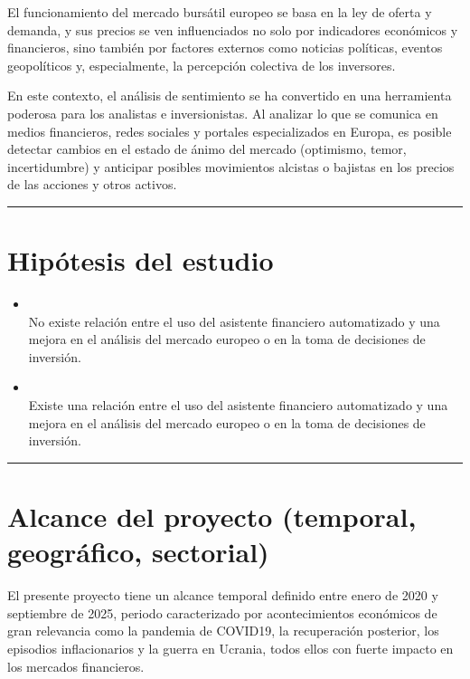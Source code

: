 \documentclass[letterpaper,10pt,spanish]{sphinxmanual}
\begin{document}
\sphinxAtStartPar
El funcionamiento del mercado bursátil europeo se basa en la ley de oferta y demanda, y sus precios se ven influenciados no solo por indicadores económicos y financieros, sino también por factores externos como noticias políticas, eventos geopolíticos y, especialmente, la percepción colectiva de los inversores.

\sphinxAtStartPar
En este contexto, el análisis de sentimiento se ha convertido en una herramienta poderosa para los analistas e inversionistas. Al analizar lo que se comunica en medios financieros, redes sociales y portales especializados en Europa, es posible detectar cambios en el estado de ánimo del mercado (optimismo, temor, incertidumbre) y anticipar posibles movimientos alcistas o bajistas en los precios de las acciones y otros activos.


\bigskip\hrule\bigskip



\section{Hipótesis del estudio}
\label{\detokenize{DescripcionProblema:hipotesis-del-estudio}}\begin{itemize}
\item {} 
\sphinxAtStartPar
{}\\
No existe relación entre el uso del asistente financiero automatizado y una mejora en el análisis del mercado europeo o en la toma de decisiones de inversión.

\item {} 
\sphinxAtStartPar
{}\\
Existe una relación entre el uso del asistente financiero automatizado y una mejora en el análisis del mercado europeo o en la toma de decisiones de inversión.

\end{itemize}


\bigskip\hrule\bigskip



\section{Alcance del proyecto (temporal, geográfico, sectorial)}
\label{\detokenize{DescripcionProblema:alcance-del-proyecto-temporal-geografico-sectorial}}
\sphinxAtStartPar
El presente proyecto tiene un alcance temporal definido entre enero de 2020 y septiembre de 2025, periodo caracterizado por acontecimientos económicos de gran relevancia como la pandemia de COVID\sphinxhyphen{}19, la recuperación posterior, los episodios inflacionarios y la guerra en Ucrania, todos ellos con fuerte impacto en los mercados financieros.
\end{document}
